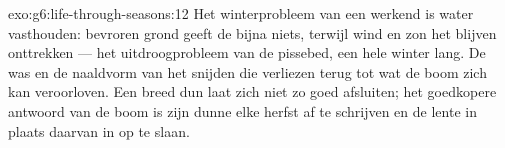\begin{solution}{exo:g6:life-through-seasons:12}
Het winterprobleem van een werkend  is water vasthouden: bevroren
grond geeft de  bijna niets, terwijl wind en zon het blijven
onttrekken --- het uitdroogprobleem van de pissebed, een hele winter
lang. De was en de naaldvorm van het   snijden die
verliezen terug tot wat de boom zich kan veroorloven. Een breed dun 
laat zich niet zo goed afsluiten; het goedkopere antwoord van de
 boom is zijn dunne  elke herfst af te schrijven
en de lente in plaats daarvan in  op te slaan.
\end{solution}


